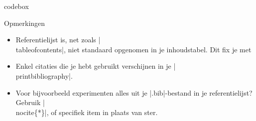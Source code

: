 \begin{saveblock}{codebox}
	\begin{highlightblock}[linewidth=\dimexpr\linewidth - 21.9pt\relax]
	\end{highlightblock}
\end{saveblock}

\begin{frame}{Opmerkingen}%
	\begin{itemize}
		\item Referentielijst is, net zoals \hll|\\tableofcontents|, niet standaard opgenomen in je
		inhoudstabel. Dit fix je met
		
		\item Enkel citaties die je hebt gebruikt verschijnen in je \hll|\\printbibliography|.
		\item Voor bijvoorbeeld experimenten alles uit je \hll|.bib|-bestand in je referentielijst?
		Gebruik \hll|\\nocite\{*\}|, of specifiek item in plaats van ster.
	\end{itemize}
\end{frame}


